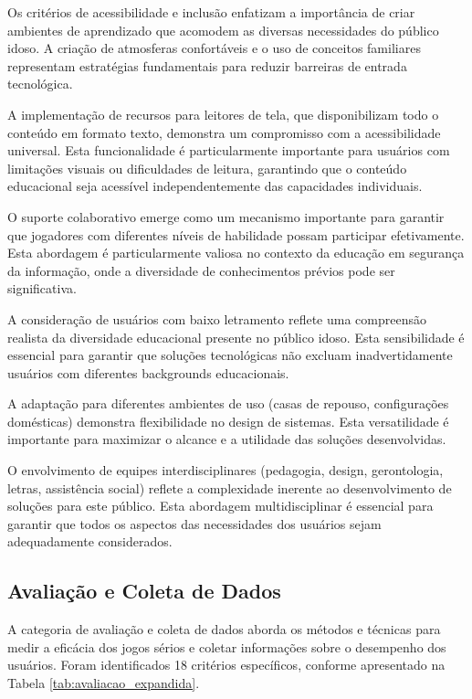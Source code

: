 \begin{table}[H]
Os critérios de acessibilidade e inclusão enfatizam a importância de criar ambientes de aprendizado que acomodem as diversas necessidades do público idoso. A criação de atmosferas confortáveis e o uso de conceitos familiares representam estratégias fundamentais para reduzir barreiras de entrada tecnológica.

A implementação de recursos para leitores de tela, que disponibilizam todo o conteúdo em formato texto, demonstra um compromisso com a acessibilidade universal. Esta funcionalidade é particularmente importante para usuários com limitações visuais ou dificuldades de leitura, garantindo que o conteúdo educacional seja acessível independentemente das capacidades individuais.

O suporte colaborativo emerge como um mecanismo importante para garantir que jogadores com diferentes níveis de habilidade possam participar efetivamente. Esta abordagem é particularmente valiosa no contexto da educação em segurança da informação, onde a diversidade de conhecimentos prévios pode ser significativa.

A consideração de usuários com baixo letramento reflete uma compreensão realista da diversidade educacional presente no público idoso. Esta sensibilidade é essencial para garantir que soluções tecnológicas não excluam inadvertidamente usuários com diferentes backgrounds educacionais.

A adaptação para diferentes ambientes de uso (casas de repouso, configurações domésticas) demonstra flexibilidade no design de sistemas. Esta versatilidade é importante para maximizar o alcance e a utilidade das soluções desenvolvidas.

O envolvimento de equipes interdisciplinares (pedagogia, design, gerontologia, letras, assistência social) reflete a complexidade inerente ao desenvolvimento de soluções para este público. Esta abordagem multidisciplinar é essencial para garantir que todos os aspectos das necessidades dos usuários sejam adequadamente considerados.

\subsection{Avaliação e Coleta de Dados}
\label{subsec:avaliacao_expandida}

A categoria de avaliação e coleta de dados aborda os métodos e técnicas para medir a eficácia dos jogos sérios e coletar informações sobre o desempenho dos usuários. Foram identificados 18 critérios específicos, conforme apresentado na Tabela \ref{tab:avaliacao_expandida}.


\end{table}
